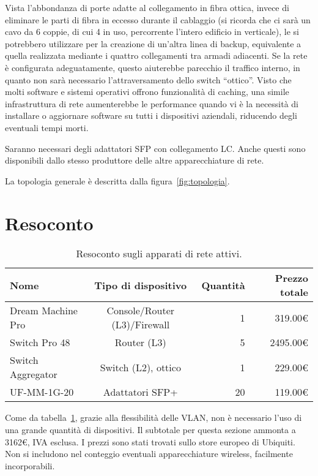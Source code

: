 Vista l'abbondanza di porte adatte al collegamento in fibra ottica, invece di eliminare le parti di fibra
in eccesso durante il cablaggio (si ricorda che ci sarà un cavo da 6 coppie, di cui 4 in uso, percorrente
l'intero edificio in verticale), le si potrebbero utilizzare per la creazione di un'altra linea di backup,
equivalente a quella realizzata mediante i quattro collegamenti tra armadi adiacenti. Se la rete è
configurata adeguatamente, questo aiuterebbe parecchio il traffico interno, in quanto non sarà necessario
l'attraversamento dello switch ``ottico''. Visto che molti software e sistemi operativi offrono funzionalità
di caching, una simile infrastruttura di rete aumenterebbe le performance quando vi è la necessità di installare
o aggiornare software su tutti i dispositivi aziendali, riducendo degli eventuali tempi morti.

Saranno necessari degli adattatori SFP con collegamento LC. Anche questi sono disponibili dallo stesso produttore
delle altre apparecchiature di rete.

La topologia generale è descritta dalla figura~\ref{fig:topologia}.

\newpage
\section{Resoconto}

\begin{table}[ht]
  \begin{tabular}{@{}lcrr@{}}
    \toprule
    Nome              & Tipo di dispositivo          & Quantità & Prezzo totale \\ \midrule
    Dream Machine Pro & Console/Router (L3)/Firewall & 1        & 319.00€       \\ \midrule
    Switch Pro 48     & Router (L3)                  & 5        & 2495.00€      \\ \midrule
    Switch Aggregator & Switch (L2), ottico          & 1        & 229.00€       \\ \midrule
    UF-MM-1G-20       & Adattatori SFP+              & 20       & 119.00€       \\ \bottomrule
  \end{tabular}
  \caption{Resoconto sugli apparati di rete attivi.}\label{tab:apparati-rete}
\end{table}

Come da tabella~\ref{tab:apparati-rete}, grazie alla flessibilità delle VLAN, non è necessario
l'uso di una grande quantità di dispositivi. Il subtotale per questa sezione ammonta a 3162€, IVA esclusa.
I prezzi sono stati trovati sullo store europeo di Ubiquiti. Non si includono nel conteggio eventuali
apparecchiature wireless, facilmente incorporabili.

